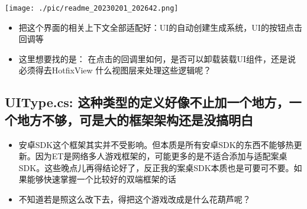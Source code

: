 \documentclass[9pt, b5paper]{article}
\begin{document}
\texttt{[image: ./pic/readme\_20230201\_202642.png]}
\begin{itemize}
\item 把这个界面的相关上下文全部适配好：UI的自动创建生成系统，UI的按钮点击回调等
\item 这里想要找的是： 在点击的回调里如何，是否可以卸载装载UI组件，还是说必须得去HotfixView 什么视图层来处理这些逻辑呢？
\end{itemize}
\subsection{UIType.cs: 这种类型的定义好像不止加一个地方，一个地方不够，可是大的框架架构还是没搞明白}
\label{sec-4-1}
\begin{itemize}
\item 安卓SDK这个框架其实并不受影响。但本质是所有安卓SDK的东西不能够热更新。因为ET是网络多人游戏框架的，可能更多的是不适合添加与适配案桌SDK。这些晚点儿再得结论好了，反正我的案桌SDK本质也是可要可不要。如果能够快速掌握一个比较好的双端框架的话
\item 不知道若是照这么改下去，得把这个游戏改成是什么花葫芦呢？
\end{itemize}
\end{document}
